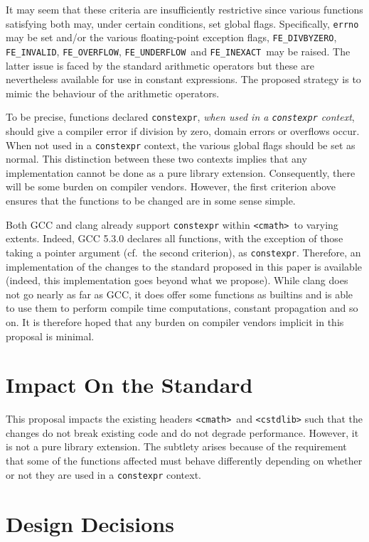 \documentclass[prd,preprint,amsmath,amssymb,nofootinbib,eqsecnum]{revtex4-1}
\newcommand{\constexpr}{\code{constexpr}\xspace}
\newcommand{\code}[1]{{\tt #1}}
\newcommand{\header}[1]{{\tt <#1>}}
\newcommand{\cmath}{\header{cmath}}
\newcommand{\FEINVALID}{{\tt FE\_INVALID}}
\newcommand{\FEDIVBYZERO}{{\tt FE\_DIVBYZERO}}
\newcommand{\FEINEXACT}{{\tt FE\_INEXACT}}
\newcommand{\FEUNDERFLOW}{{\tt FE\_UNDERFLOW}}
\newcommand{\FEOVERFLOW}{{\tt FE\_OVERFLOW}}
\begin{document}
It may seem that these criteria are insufficiently restrictive since various
functions satisfying both may, under certain conditions, set global flags.
Specifically, \code{errno} may be set and/or the various floating-point
exception flags, \FEDIVBYZERO, \FEINVALID, \FEOVERFLOW, \FEUNDERFLOW\ and
\FEINEXACT\ may be raised. The latter issue is 
faced by the standard
arithmetic operators but these are nevertheless available for use in constant
expressions. The proposed strategy is to mimic the behaviour of the arithmetic
operators.

To be precise, functions declared \constexpr, \emph{when used in a \constexpr
context}, should give a compiler error if division by zero, domain errors or
overflows occur. When not used in a \constexpr context, the various global
flags should be set as normal. This distinction between these two contexts
implies that any implementation cannot be done as a pure library extension.
Consequently, there will be some burden on compiler vendors. However, the first
criterion above ensures that the functions to be changed are in some sense
simple.

Both GCC and clang already support \constexpr within \cmath\ to varying extents. 
Indeed, GCC 5.3.0 declares all functions, with the exception of those taking a pointer argument
(cf.\ the second criterion), as \constexpr. Therefore, an implementation of the changes to the standard proposed in this paper is available (indeed, this implementation goes beyond what we propose).
While clang does not go nearly as far as GCC, it does offer some functions as 
builtins and is able to use them to perform compile time computations, constant
propagation and so on. It is therefore hoped that any burden on compiler vendors implicit in this
proposal is minimal.

\section{Impact On the Standard}

This proposal impacts the existing headers \cmath\ and \header{cstdlib} such
that the changes do not break existing code and do not degrade performance.
However, it is not a pure library extension. The subtlety arises because of the
requirement that some of the functions affected must behave differently
depending on whether or not they are used in a \constexpr context.

\section{Design Decisions}
\end{document}
